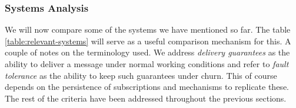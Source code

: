 \subsubsection{Systems Analysis}\label{systems-overview}

We will now compare some of the systems we have mentioned so far. The
table \ref{table:relevant-systems} will serve as a useful comparison mechanism for this.
A couple of notes on the terminology used. We address \emph{delivery guarantees} as the
ability to deliver a message under normal working conditions and refer to \emph{fault tolerance}
as the ability to keep such guarantees under churn. This of course depends on the
persistence of subscriptions and mechanisms to replicate these. The rest of the criteria have been
addressed throughout the previous sections.

